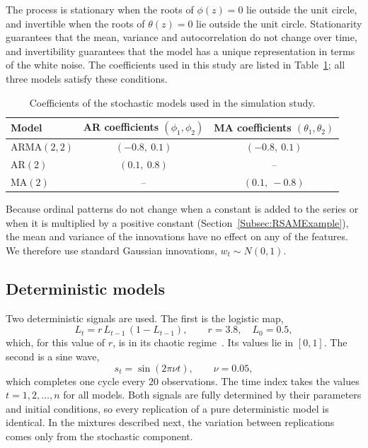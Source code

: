 The process is stationary when the roots of $\phi(z)=0$ lie outside the unit circle, and invertible when the roots of $\theta(z)=0$ lie outside the unit circle. Stationarity guarantees that the mean, variance and autocorrelation do not change over time, and invertibility guarantees that the model has a unique representation in terms of the white noise. 
The coefficients used in this study are listed in Table~\ref{tab:SimParameters}; all three models satisfy these conditions.

\begin{table}[H]
	\centering
	\begin{tabular}{lcc}
		\toprule
		Model & AR coefficients $(\phi_1,\phi_2)$ & MA coefficients $(\theta_1,\theta_2)$ \\
		\midrule
		ARMA$(2,2)$ & $(-0.8,\ 0.1)$ & $(-0.8,\ 0.1)$ \\
		AR$(2)$     & $(0.1,\ 0.8)$  & -- \\
		MA$(2)$     & --             & $(0.1,\ -0.8)$ \\
		\bottomrule
	\end{tabular}
	\caption{Coefficients of the stochastic models used in the simulation study.}
	\label{tab:SimParameters}
\end{table}

Because ordinal patterns do not change when a constant is added to the series or when it is multiplied by a positive constant (Section~\ref{Subsec:RSAMExample}), the mean and variance of the innovations have no effect on any of the features. We therefore use standard Gaussian innovations, $w_t\sim N(0,1)$.

\subsection{Deterministic models}\label{Subsec:SimDeterministic}

Two deterministic signals are used. The first is the logistic map,
\begin{equation}
	L_t=r\,L_{t-1}\,(1-L_{t-1}),\qquad r=3.8,\quad L_0=0.5,
	\label{eq:Logistic}
\end{equation}
which, for this value of $r$, is in its chaotic regime~\cite{May1976}. Its values lie in $[0,1]$. The second is a sine wave,
\begin{equation}
	s_t=\sin(2\pi\nu t),\qquad \nu=0.05,
	\label{eq:Sine}
\end{equation}
which completes one cycle every $20$ observations. The time index takes the values $t=1,2,\dots,n$ for all models. Both signals are fully determined by their parameters and initial conditions, so every replication of a pure deterministic model is identical. In the mixtures described next, the variation between replications comes only from the stochastic component.

